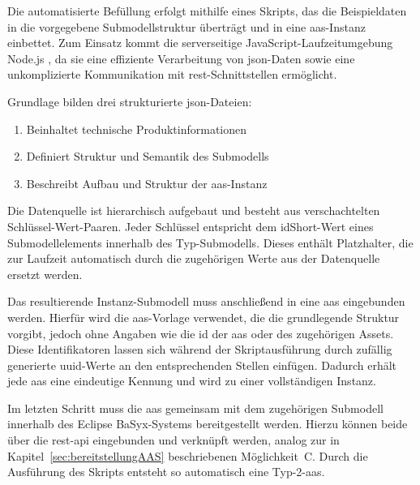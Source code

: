 Die automatisierte Befüllung erfolgt mithilfe eines Skripts, das die Beispieldaten in die vorgegebene Submodellstruktur überträgt und in eine \acs{aas}-Instanz einbettet.
Zum Einsatz kommt die serverseitige JavaScript-Laufzeitumgebung Node.js \cite{nodejs}, da sie eine effiziente Verarbeitung von \acs{json}-Daten sowie eine unkomplizierte Kommunikation mit \acs{rest}-Schnittstellen ermöglicht.

Grundlage bilden drei strukturierte \acs{json}-Dateien:

\vspace{0.2em}
\begin{enumerate}[noitemsep, parsep=0.2em, label=\textbf{\arabic*.}, labelsep=0.4em]
    \item {}    Beinhaltet technische Produktinformationen
    \item {}  Definiert Struktur und Semantik des Submodells
    \item {}    Beschreibt Aufbau und Struktur der \acs{aas}-Instanz
\end{enumerate}
\vspace{0.2em}

Die Datenquelle ist hierarchisch aufgebaut und besteht aus verschachtelten Schlüssel-Wert-Paaren.
Jeder Schlüssel entspricht dem idShort-Wert eines Submodellelements innerhalb des Typ-Submodells.
Dieses enthält Platzhalter, die zur Laufzeit automatisch durch die zugehörigen Werte aus der Datenquelle ersetzt werden.

Das resultierende Instanz-Submodell muss anschließend in eine \acs{aas} eingebunden werden. 
Hierfür wird die \acs{aas}-Vorlage verwendet, die die grundlegende Struktur vorgibt, jedoch ohne Angaben wie die \acs{id} der \acs{aas} oder des zugehörigen Assets. 
Diese Identifikatoren lassen sich während der Skriptausführung durch zufällig generierte \ac{uuid}-Werte an den entsprechenden Stellen einfügen.
Dadurch erhält jede \acs{aas} eine eindeutige Kennung und wird zu einer vollständigen Instanz.

Im letzten Schritt muss die \acs{aas} gemeinsam mit dem zugehörigen Submodell innerhalb des Eclipse BaSyx-Systems bereitgestellt werden. 
Hierzu können beide über die \acs{rest}-\acs{api} eingebunden und verknüpft werden, analog zur in Kapitel~\ref{sec:bereitstellungAAS} beschriebenen Möglichkeit~C.
Durch die Ausführung des Skripts entsteht so automatisch eine Typ-2-\acs{aas}.
